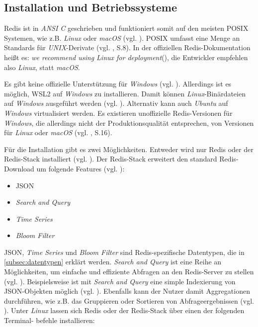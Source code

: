 
\subsection{Installation und Betriebssysteme}
\label{subsection:installation}

\acs{Redis} ist in \textit{ANSI C} geschrieben und funktioniert somit auf den meisten \acs{POSIX} Systemen, wie z.B. \textit{Linux} oder \textit{macOS} (vgl. \cite{Redis-Docs-Intro}). \ac{POSIX} umfasst eine Menge an Standards für \textit{UNIX}-Derivate (vgl. \cite{15}, S.8). In der offiziellen \ac{Redis}-Dokumentation heißt es: \glqq \textit{we recommend using Linux for deployment}\grqq (\cite{Redis-Docs-Intro}), die Entwickler empfehlen also \textit{Linux}, statt \textit{macOS}.

Es gibt keine offizielle Unterstützung für \textit{Windows} (vgl. \cite{Redis-Docs-Intro}). Allerdings ist es möglich, \ac{WSL2} auf \textit{Windows} zu installieren. Damit können \textit{Linux}-Binärdateien auf \textit{Windows} ausgeführt werden (vgl. \cite{Redis-Docs-Install-W}). Alternativ kann auch \textit{Ubuntu} auf \textit{Windows} virtualisiert werden. Es existieren unoffizielle \ac{Redis}-Versionen für \textit{Windows}, die allerdings nicht der Produktionsqualität entsprechen, von Versionen für \textit{Linux} oder \textit{macOS} (vgl. \cite{4}, S.16). 

Für die Installation gibt es zwei Möglichkeiten. Entweder wird nur \ac{Redis} oder der \ac{Redis}-Stack installiert (vgl. \cite{Redis-Docs-Install-R-or-RS}). Der \ac{Redis}-Stack erweitert den standard \ac{Redis}-Download um folgende Features (vgl. \cite{Redis-Docs-Redis-Stack}):

\begin{itemize}
	\item \ac{JSON}
	\item \textit{Search and Query}
	\item \textit{Time Series}
	\item \textit{Bloom Filter}
\end{itemize}

\ac{JSON}, \textit{Time Series} und \textit{Bloom Filter} sind \ac{Redis}-spezifische Datentypen, die in \autoref{subsec:datentypen} erklärt werden. \textit{Search and Query} ist eine Reihe an Möglichkeiten, um einfache und effiziente Abfragen an den \ac{Redis}-Server zu stellen (vgl. \cite{Redis-Docs-Search-Query}). Beispielsweise ist mit \textit{Search and Query} eine simple Indexierung von \ac{JSON}-Objekten möglich (vgl. \cite{Redis-Docs-Search-Query}). Ebenfalls kann der Nutzer damit Aggregationen durchführen, wie z.B. das Gruppieren oder Sortieren von Abfrageergebnissen (vgl. \cite{Redis-Docs-Aggregation}).  
\newpage
Unter \textit{Linux} lassen sich \ac{Redis} oder der \ac{Redis}-Stack über einen der folgenden Terminal- befehle installieren:

